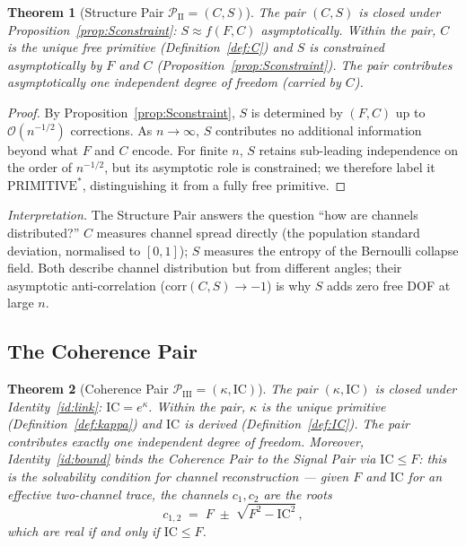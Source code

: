 \documentclass[
  aps,
  prd,
  twocolumn,
  superscriptaddress,
  nofootinbib,
  floatfix
]{revtex4-2}
\newtheorem{theorem}{Theorem}
\newcommand{\IC}{\mathrm{IC}}
\newcommand{\corr}{\mathrm{corr}}
\begin{document}
\begin{theorem}[Structure Pair $\mathcal{P}_{\mathrm{II}}=(C,S)$]\label{thm:structure}
The pair $(C,S)$ is closed under
Proposition~\ref{prop:Sconstraint}: $S\approx f(F,C)$
asymptotically.  Within the pair, $C$ is the unique free
primitive (Definition~\ref{def:C}) and $S$ is constrained
asymptotically by $F$ and $C$
(Proposition~\ref{prop:Sconstraint}).  The pair contributes
asymptotically one independent degree of freedom (carried by
$C$).
\end{theorem}

\begin{proof}
By Proposition~\ref{prop:Sconstraint}, $S$ is determined by
$(F,C)$ up to $\mathcal{O}(n^{-1/2})$ corrections.  As
$n\to\infty$, $S$ contributes no additional information beyond
what $F$ and $C$ encode.  For finite $n$, $S$ retains
sub-leading independence on the order of $n^{-1/2}$, but its
asymptotic role is constrained; we therefore label it
$\mathrm{PRIMITIVE}^{*}$, distinguishing it from a fully free
primitive.
\end{proof}

\emph{Interpretation.}  The Structure Pair answers the question
``how are channels distributed?''  $C$ measures channel spread
directly (the population standard deviation, normalised to
$[0,1]$); $S$ measures the entropy of the Bernoulli collapse
field.  Both describe channel distribution but from different
angles; their asymptotic anti-correlation
($\corr(C,S)\to -1$) is why $S$ adds zero free DOF at large $n$.

\subsection{The Coherence Pair}

\begin{theorem}[Coherence Pair $\mathcal{P}_{\mathrm{III}}=(\kappa,\IC)$]\label{thm:coherence}
The pair $(\kappa,\IC)$ is closed under Identity~\ref{id:link}:
$\IC=e^{\kappa}$.  Within the pair, $\kappa$ is the unique
primitive (Definition~\ref{def:kappa}) and $\IC$ is derived
(Definition~\ref{def:IC}).  The pair contributes exactly one
independent degree of freedom.  Moreover, Identity~\ref{id:bound}
binds the Coherence Pair to the Signal Pair via $\IC\leq F$:
this is the \emph{solvability condition} for channel
reconstruction --- given $F$ and $\IC$ for an effective two-channel
trace, the channels $c_1,c_2$ are the roots
\begin{equation}\label{eq:cardano}
  c_{1,2} \;=\; F \;\pm\; \sqrt{F^2 - \IC^2}\,,
\end{equation}
which are real if and only if $\IC \leq F$.
\end{theorem}
\end{document}
